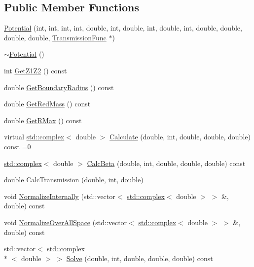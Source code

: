 \subsection*{Public Member Functions}
\begin{DoxyCompactItemize}
\item 
\hyperlink{classPotential_a4fc0ce6be68500162a02df2175f6a122}{Potential} (int, int, int, int, double, int, double, int, double, int, double, double, double, double, \hyperlink{classTransmissionFunc}{Transmission\-Func} $\ast$)
\item 
\hyperlink{classPotential_ad50069dfb8df6538d94c4e3dcce26a6d}{$\sim$\-Potential} ()
\item 
int \hyperlink{classPotential_a0703b38c5987f1b81cbafae5a6d1ab0c}{Get\-Z1\-Z2} () const 
\item 
double \hyperlink{classPotential_a76d8dff6de0e098d8ec4fdf355363a57}{Get\-Boundary\-Radius} () const 
\item 
double \hyperlink{classPotential_a75d7cf1ca990cfe41be3e63caff7b2f1}{Get\-Red\-Mass} () const 
\item 
double \hyperlink{classPotential_a154fb8deeab61df6a0b55e2806844246}{Get\-R\-Max} () const 
\item 
virtual \hyperlink{Constants_8h_a1c1b16cc02d518bbe753449171ab7033}{std\-::complex}$<$ double $>$ \hyperlink{classPotential_af6d2217c4a1f91e7ebb84d5b728d11aa}{Calculate} (double, int, double, double, double) const =0
\item 
\hyperlink{Constants_8h_a1c1b16cc02d518bbe753449171ab7033}{std\-::complex}$<$ double $>$ \hyperlink{classPotential_a4e19e3b9ee8abf94d2c8e072daf46206}{Calc\-Beta} (double, int, double, double, double) const 
\item 
double \hyperlink{classPotential_aea8adb2a1783a79985621a899118c967}{Calc\-Transmission} (double, int, double)
\item 
void \hyperlink{classPotential_a6ecf02124b7690f05488a5fdde693d76}{Normalize\-Internally} (std\-::vector$<$ \hyperlink{Constants_8h_a1c1b16cc02d518bbe753449171ab7033}{std\-::complex}$<$ double $>$ $>$ \&, double) const 
\item 
void \hyperlink{classPotential_afaf287ffc13db37859773d092dcce2d9}{Normalize\-Over\-All\-Space} (std\-::vector$<$ \hyperlink{Constants_8h_a1c1b16cc02d518bbe753449171ab7033}{std\-::complex}$<$ double $>$ $>$ \&, double) const 
\item 
std\-::vector$<$ \hyperlink{Constants_8h_a1c1b16cc02d518bbe753449171ab7033}{std\-::complex}\\*
$<$ double $>$ $>$ \hyperlink{classPotential_a7af6c51bab5120e99024a73f79c84a37}{Solve} (double, int, double, double, double) const 
\end{DoxyCompactItemize}
